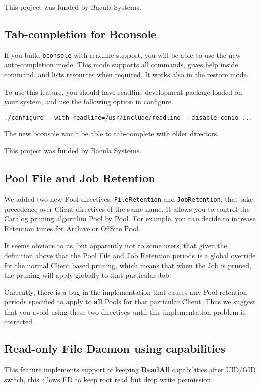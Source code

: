 This project was funded by Bacula Systems.

\subsection{Tab-completion for Bconsole}
\label{sec:tabcompletion}

If you build \texttt{bconsole} with readline support, you will be able to use
the new auto-completion mode. This mode supports all commands, gives help
inside command, and lists resources when required. It works also in the restore
mode.

To use this feature, you should have readline development package loaded on
your system, and use the following option in configure.
\begin{verbatim}
./configure --with-readline=/usr/include/readline --disable-conio ...
\end{verbatim}

The new bconsole won't be able to tab-complete with older directors.

This project was funded by Bacula Systems.

\subsection{Pool File and Job Retention}
\label{sec:poolfilejobretention}

We added two new Pool directives, \texttt{FileRetention} and
\texttt{JobRetention}, that take precedence over Client directives of the same
name. It allows you to control the Catalog pruning algorithm Pool by Pool. For
example, you can decide to increase Retention times for Archive or OffSite Pool.

It seems obvious to us, but apparently not to some users, that given the
definition above that the Pool File and Job Retention periods is a global
override for the normal Client based pruning, which means that when the
Job is pruned, the pruning will apply globally to that particular Job.

Currently, there is a bug in the implementation that causes any Pool 
retention periods specified to apply to {\bf all} Pools for that
particular Client.  Thus we suggest that you avoid using these two
directives until this implementation problem is corrected.

\subsection{Read-only File Daemon using capabilities}
\label{sec:fdreadonly}
This feature implements support of keeping \textbf{ReadAll} capabilities after
UID/GID switch, this allows FD to keep root read but drop write permission.


